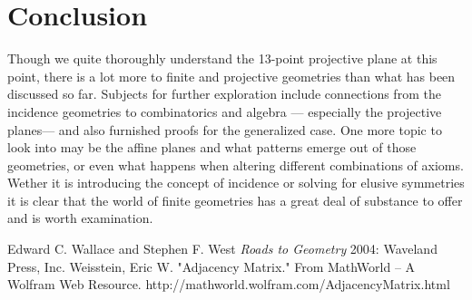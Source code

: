 \documentclass{article}
\begin{document}
\section{Conclusion}
Though we quite thoroughly understand the 13-point projective plane at this point, there is a lot more to finite and projective geometries than what has been discussed so far. Subjects for further exploration include connections from the incidence geometries to combinatorics and algebra --- especially the projective planes--- and also furnished proofs for the generalized case. One more topic to look into may be the affine planes and what patterns emerge out of those geometries, or even what happens when altering different combinations of axioms. Wether it is introducing the concept of incidence or solving for elusive symmetries it is clear that the world of finite geometries has a great deal of substance to offer and is worth examination.

\begin{thebibliography}{1}

   Edward C. Wallace and Stephen F. West {\em Roads to Geometry} 2004: Waveland Press, Inc.
  Weisstein, Eric W. "Adjacency Matrix." From MathWorld -- A Wolfram Web Resource. http://mathworld.wolfram.com/AdjacencyMatrix.html
  \end{thebibliography}
\end{document}
